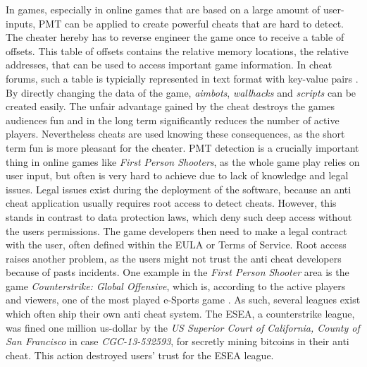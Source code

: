 In games, especially in online games that are based on a large amount of user-inputs, \gls{PMT} can be applied to create powerful cheats that are hard to detect. The cheater hereby has to reverse engineer the game once to receive a table of offsets. This table of offsets contains the relative memory locations, the relative addresses, that can be used to access important game information. In cheat forums, such a table is typicially represented in text format with key-value pairs \cite{offsets}. By directly changing the data of the game, \emph{aimbots}, \emph{wallhacks} and \emph{scripts} can be created easily. The unfair advantage gained by the cheat destroys the games audiences fun and in the long term significantly reduces the number of active players. Nevertheless cheats are used knowing these consequences, as the short term fun is more pleasant for the cheater. \gls{PMT} detection is a crucially important thing in online games like \emph{First Person Shooters}, as the whole game play relies on user input, but often is very hard to achieve due to lack of knowledge and legal issues. Legal issues exist during the deployment of the software, because an anti cheat application usually requires root access to detect cheats. However, this stands in contrast to data protection laws, which deny such deep access without the users permissions. The game developers then need to make a legal contract with the user, often defined within the \gls{EULA} or Terms of Service. Root access raises another problem, as the users might not trust the anti cheat developers because of pasts incidents. One example in the \emph{First Person Shooter} area is the game \emph{Counterstrike: Global Offensive}, which is, according to the active players and viewers, one of the most played e-Sports game \cite{csgo1, csgo2}. As such, several leagues exist which often ship their own anti cheat system. The \gls{ESEA}, a counterstrike league, was fined one million us-dollar by the \emph{US Superior Court of California, County of San Francisco} \cite{esea} in case \emph{CGC-13-532593}, for secretly mining bitcoins in their anti cheat. This action destroyed users' trust for the \gls{ESEA} league.